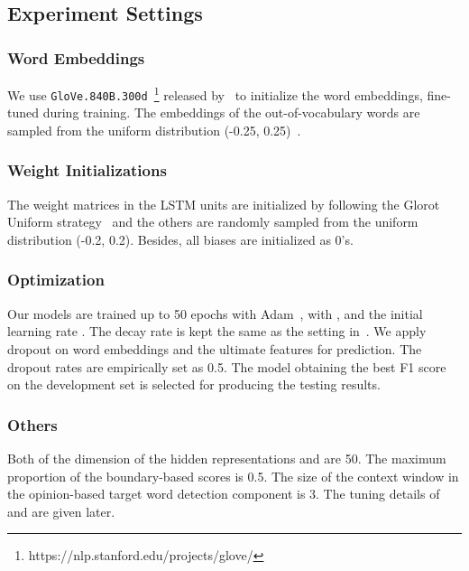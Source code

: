 \documentclass[letterpaper]{article} \usepackage{aaai19}  \usepackage{times}  \usepackage{helvet}  \usepackage{courier}  \usepackage{url}  \usepackage{graphicx}  \frenchspacing  \setlength{\pdfpagewidth}{8.5in}  \setlength{\pdfpageheight}{11in}
\begin{document}
\subsection{Experiment Settings}

\subsubsection{Word Embeddings} 
We use \texttt{GloVe.840B.300d}~\footnote{https://nlp.stanford.edu/projects/glove/} released by~\cite{D14-1162} to initialize the word embeddings, fine-tuned during training. The embeddings of the out-of-vocabulary words are sampled from the uniform distribution (-0.25, 0.25)~\cite{D14-1181}. 

\subsubsection{Weight Initializations}
The weight matrices in the LSTM units are initialized by following the Glorot Uniform strategy~\cite{glorot2010understanding} and the others are randomly sampled from the uniform distribution (-0.2, 0.2). Besides, all biases are initialized as 0's.
\subsubsection{Optimization}
Our models are trained up to 50 epochs with Adam~\cite{kingma2014adam}, with , and the initial learning rate . The decay rate is kept the same as the setting in~\cite{N16-1030}. We apply dropout on word embeddings and the ultimate features for prediction. The dropout rates are empirically set as 0.5. The model obtaining the best F1 score on the development set is selected for producing the testing results. 

\subsubsection{Others}
Both of the dimension of the hidden representations  and  are 50. The maximum proportion  of the boundary-based scores is 0.5. The size of the context window  in the opinion-based target word detection component is 3. The tuning details of  and  are given later.
\end{document}

